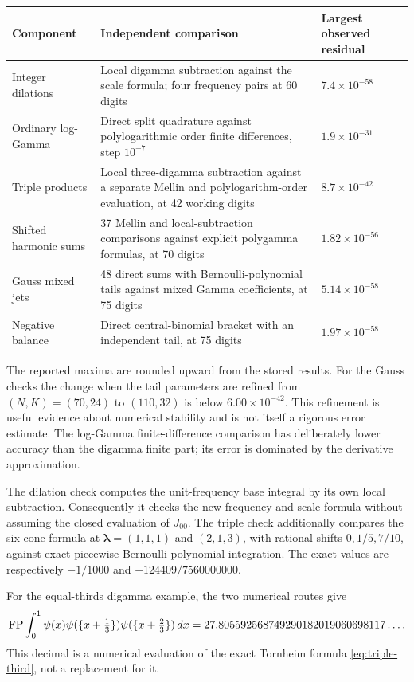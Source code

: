 \begin{center}
\small
\begin{tabularx}{\textwidth}{@{}>{\raggedright\arraybackslash}p{30mm}X >{\raggedright\arraybackslash}p{29mm}@{}}
\toprule
Component & Independent comparison & Largest observed residual\\
\midrule
Integer dilations & Local digamma subtraction against the scale formula;
four frequency pairs at 60 digits & $7.4\times10^{-58}$\\
Ordinary log-Gamma & Direct split quadrature against polylogarithmic
order finite differences, step $10^{-7}$ & $1.9\times10^{-31}$\\
Triple products & Local three-digamma subtraction against a separate
Mellin and polylogarithm-order evaluation, at 42 working digits
& $8.7\times10^{-42}$\\
Shifted harmonic sums & 37 Mellin and local-subtraction comparisons
against explicit polygamma formulas, at 70 digits
& $1.82\times10^{-56}$\\
Gauss mixed jets & 48 direct sums with Bernoulli-polynomial tails
against mixed Gamma coefficients, at 75 digits
& $5.14\times10^{-58}$\\
Negative balance & Direct central-binomial bracket with an independent
tail, at 75 digits & $1.97\times10^{-58}$\\
\bottomrule
\end{tabularx}
\end{center}

The reported maxima are rounded upward from the stored results.  For
the Gauss checks the change when the tail parameters are refined from
$(N,K)=(70,24)$ to $(110,32)$ is below $6.00\times10^{-42}$.
This refinement is useful evidence about numerical stability and is
not itself a rigorous error estimate.  The log-Gamma finite-difference
comparison has deliberately lower accuracy than the digamma finite
part; its error is dominated by the derivative approximation.

The dilation check computes the unit-frequency base integral by its own
local subtraction.  Consequently it checks the new frequency and scale
formula without assuming the closed evaluation of $J_{00}$.  The
triple check additionally compares the six-cone formula at
$\boldsymbol\lambda=(1,1,1)$ and $(2,1,3)$, with rational shifts
$0,1/5,7/10$, against exact piecewise Bernoulli-polynomial integration.
The exact values are respectively $-1/1000$ and
$-124409/7560000000$.

For the equal-thirds digamma example, the two numerical routes give
\begin{equation}\label{eq:numeric-triple}
 \operatorname{FP}\int_0^1\psi(x)\psi(\{x+\tfrac13\})
                     \psi(\{x+\tfrac23\})\,dx
 =27.805592568749290182019060698117\ldots.
\end{equation}
This decimal is a numerical evaluation of the exact Tornheim formula
\eqref{eq:triple-third}, not a replacement for it.

